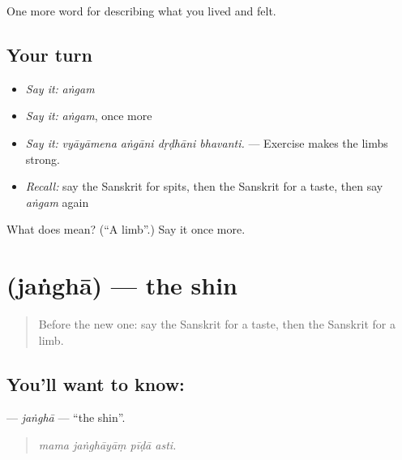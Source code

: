 \begin{grammarlens}[title={What you've built}]
One more word for describing what you lived and felt.
\end{grammarlens}

\subsection*{Your turn}
\begin{itemize}
\raggedright
  \item \emph{Say it:} \emph{aṅgam}
  \item \emph{Say it:} \emph{aṅgam}, once more
  \item \emph{Say it:} \emph{vyāyāmena aṅgāni dṛḍhāni bhavanti.} — Exercise makes the limbs strong.
  \item \emph{Recall:} say the Sanskrit for spits, then the Sanskrit for a taste, then say \emph{aṅgam} again
\end{itemize}

\begin{tcolorbox}[breakable,colback=teal!4,colframe=teal!35!black,title={Before you move on}]
What does  mean? (\textquotedblleft{}A limb\textquotedblright{}.) Say it once more.
\end{tcolorbox}
\section[\texorpdfstring{\sk{जंघा} (jaṅghā)}{जंघा (jaṅghā)}]{ (jaṅghā) — the shin}

\label{lesson:SA-C473-jangha}



\begin{quote}
Before the new one: say the Sanskrit for a taste, then the Sanskrit for a limb.
\end{quote}

\subsection*{You'll want to know: }
\textbf{} — \emph{jaṅghā} — \textquotedblleft{}the shin\textquotedblright{}.

\begin{quote}
   
\end{quote}

\begin{quote}
\emph{mama jaṅghāyāṃ pīḍā asti.}
\end{quote}

